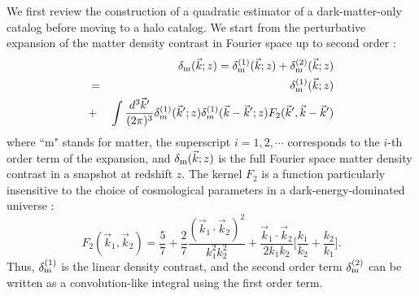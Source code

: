 \documentclass[prd,amsmath,amssymb,floatfix,superscriptaddress,nofootinbib,twocolumn]{revtex4-1}
\def\be{\begin{equation}}
\def\ee{\end{equation}}
\def\bea{\begin{eqnarray}}
\def\eea{\end{eqnarray}}
\newcommand{\vs}{\nonumber\\}
\newcommand{\vk}{\vec{k}}
\newcommand{\eql}[1]{\label{eq:#1}}
\begin{document}
\noindent We first review the construction of a quadratic estimator of
a dark-matter-only catalog \cite{Li:2020fir} before moving to a halo
catalog. We start from the perturbative expansion of the matter density
contrast in Fourier space up to second order
\cite{Jain:1994sop}\cite{Bernardeau:2002rev}: \bea &&\delta_{\rm
  m}(\vk;z)=\delta^{(1)}_{\rm m}(\vk;z)+\delta^{(2)}_{\rm m}(\vk;z)\vs
&=&\delta^{(1)}_{\rm m}(\vk;z)\vs &+&\int
\frac{d^{3}\vec{k}'}{(2\pi)^3}\delta^{(1)}_{m}(\vec{k}';z)\delta^{(1)}_{m}(\vec{k}-\vec{k}';z){F}_{2}(\vec{k}',\vec{k}-\vec{k}')
\eql{tayl} \eea where ``m" stands for matter, the superscript
$i=1,2,\cdots$ corresponds to the $i$-th order term of the expansion,
and $\delta_{\rm m}(\vk;z)$ is the full Fourier space matter density
contrast in a snapshot at redshift $z$. The
kernel $F_{2}$ is a function particularly insensitive to the choice of
cosmological parameters in a dark-energy-dominated universe
\cite{Takahashi:2008to}: \be
F_{2}(\vk_1,\vk_2)=\frac{5}{7}+\frac{2}{7}\frac{(\vk_1\cdot
  \vk_2)^2}{k_1^2 k_2^2}+\frac{\vk_1\cdot
  \vk_2}{2k_1k_2}\bigg[\frac{k_1}{k_2}+\frac{k_2}{k_1}\bigg].\eql{f2}
\ee Thus, $\delta_{\rm m}^{(1)}$ is the linear density contrast, and
the second order term $\delta_{\rm m}^{(2)}$ can be written as a
convolution-like integral using the first order term.
\end{document}
